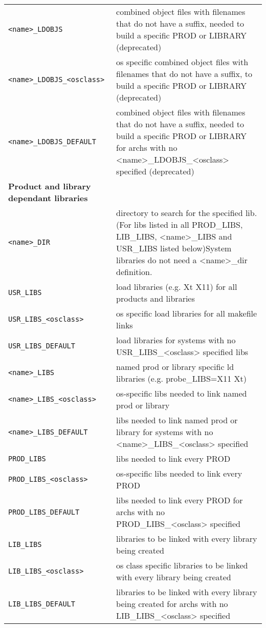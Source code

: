 \begin{center}
\begin{longtable}{p{2.94784in}p{3.76247in}}
\verb|<name>_LDOBJS| & combined object files with filenames that do not have a suffix, needed to build a specific PROD or LIBRARY (deprecated)\\
\verb|<name>_LDOBJS_<osclass>| & os specific combined object files with filenames that do not have a suffix, to build a specific PROD or LI\textbar{}BRARY (deprecated)\\
\verb|<name>_LDOBJS_DEFAULT| & combined object files with filenames that do not have a suffix, needed to build a specific PROD or LIBRARY for archs with no \textless{}name\textgreater{}\_LDOBJS\_\textless{}osclass\textgreater{} specified (deprecated)\\
\textbf{Product and library dependant libraries} & \\
\verb|<name>_DIR| & directory to search for the specified lib. (For libs listed in all PROD\_LIBS, LIB\_LIBS, \textless{}name\textgreater{}\_LIBS and USR\_LIBS listed below)System libraries do not need a \textless{}name\textgreater{}\_dir definition.\\
\verb|USR_LIBS| & load libraries (e.g. Xt X11) for all products and libraries\\
\verb|USR_LIBS_<osclass>| & os specific load libraries for all makefile links\\
\verb|USR_LIBS_DEFAULT| & load libraries for systems with no USR\_LIBS\_\textless{}osclass\textgreater{} specified libs\\
\verb|<name>_LIBS| & named prod or library specific ld libraries (e.g. probe\_LIBS=X11 Xt)\\
\verb|<name>_LIBS_<osclass>| & os-specific libs needed to link named prod or library\\
\verb|<name>_LIBS_DEFAULT| & libs needed to link named prod or library for systems with no \textless{}name\textgreater{}\_LIBS\_\textless{}osclass\textgreater{} specified\\
\verb|PROD_LIBS| & libs needed to link every PROD\\
\verb|PROD_LIBS_<osclass>| & os-specific libs needed to link every PROD\\
\verb|PROD_LIBS_DEFAULT| & libs needed to link every PROD for archs with no PROD\_LIBS\_\textless{}osclass\textgreater{} specified\\
\verb|LIB_LIBS| & libraries to be linked with every library being created\\
\verb|LIB_LIBS_<osclass>| & os class specific libraries to be linked with every library being created\\
\verb|LIB_LIBS_DEFAULT| & libraries to be linked with every library being created for archs with no LIB\_LIBS\_\textless{}osclass\textgreater{} specified\\

\end{longtable}
\end{center}
